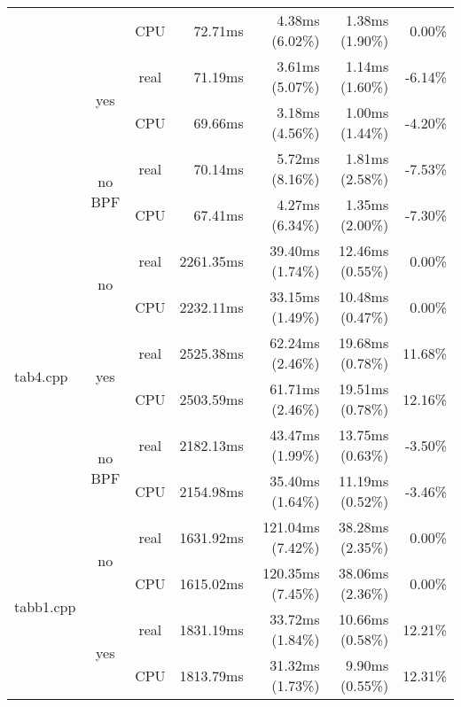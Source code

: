 \documentclass[en]{pracamgr}
\begin{document}
\begin{small}
\begin{longtable}{|l|c|c|r|r|r|r|}
                            &                         & CPU  & 72.71ms & 4.38ms (6.02\%) & 1.38ms (1.90\%) & 0.00\% \\*
                            \cline{2-7}
                            & \multirow{2}{*}{yes}    & real & 71.19ms & 3.61ms (5.07\%) & 1.14ms (1.60\%) & -6.14\% \\*
                            &                         & CPU  & 69.66ms & 3.18ms (4.56\%) & 1.00ms (1.44\%) & -4.20\% \\*
                            \cline{2-7}
                            & \multirow{2}{*}{no BPF} & real & 70.14ms & 5.72ms (8.16\%) & 1.81ms (2.58\%) & -7.53\% \\*
                            &                         & CPU  & 67.41ms & 4.27ms (6.34\%) & 1.35ms (2.00\%) & -7.30\% \\
\hline
\multirow{6}{*}{tab4.cpp}   & \multirow{2}{*}{no}     & real & 2261.35ms & 39.40ms (1.74\%) & 12.46ms (0.55\%) & 0.00\% \\*
                            &                         & CPU  & 2232.11ms & 33.15ms (1.49\%) & 10.48ms (0.47\%) & 0.00\% \\*
                            \cline{2-7}
                            & \multirow{2}{*}{yes}    & real & 2525.38ms & 62.24ms (2.46\%) & 19.68ms (0.78\%) & 11.68\% \\*
                            &                         & CPU  & 2503.59ms & 61.71ms (2.46\%) & 19.51ms (0.78\%) & 12.16\% \\*
                            \cline{2-7}
                            & \multirow{2}{*}{no BPF} & real & 2182.13ms & 43.47ms (1.99\%) & 13.75ms (0.63\%) & -3.50\% \\*
                            &                         & CPU  & 2154.98ms & 35.40ms (1.64\%) & 11.19ms (0.52\%) & -3.46\% \\
\hline
\multirow{6}{*}{tabb1.cpp}  & \multirow{2}{*}{no}     & real & 1631.92ms & 121.04ms (7.42\%) & 38.28ms (2.35\%) & 0.00\% \\*
                            &                         & CPU  & 1615.02ms & 120.35ms (7.45\%) & 38.06ms (2.36\%) & 0.00\% \\*
                            \cline{2-7}
                            & \multirow{2}{*}{yes}    & real & 1831.19ms & 33.72ms (1.84\%) & 10.66ms (0.58\%) & 12.21\% \\*
                            &                         & CPU  & 1813.79ms & 31.32ms (1.73\%) & 9.90ms (0.55\%) & 12.31\% \\*

\end{longtable}
\end{small}
\end{document}
